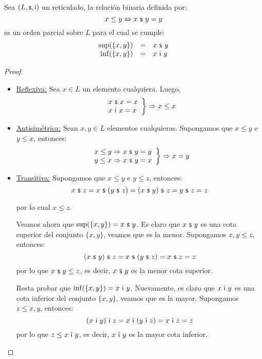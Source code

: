   \begin{theorem} \label{theorem_4}
    \PN Sea $(L, \mathsf{s}, \mathsf{i})$ un reticulado, la relación binaria definida por:
    \[
      x \leq y \Leftrightarrow x \ \SU \ y = y
    \]
    \PN es un orden parcial sobre $L$ para el cual se cumple:
    \[
      \begin{array}{rcl}
        \sup (\{x, y\}) &=& x \ \mathsf{s} \ y \\
        \inf (\{x, y\}) &=& x \ \mathsf{i} \ y
      \end{array}
    \]
  \end{theorem}
  \begin{proof}
    \begin{itemize}
      \item \underline{Reflexiva:} Sea $x \in L$ un elemento cualquiera. Luego,
        \begin{equation*}
          \left.
          \begin{array}{l}
            x \ \mathsf{s} \ x = x \\
            x \ \mathsf{i} \ x = x
          \end{array}
          \right \rbrace \Rightarrow x \leq x
        \end{equation*}

      \item \underline{Antisimétrica:} Sean $x, y \in L$ elementos cualquieras. Supongamos que $x \leq y$ e $y \leq x$,
        entonces:
        \begin{equation*}
          \left.
          \begin{array}{l}
            x \leq y \Rightarrow x \ \mathsf{s} \ y = y \\
            y \leq x \Rightarrow x \ \mathsf{s} \ y = x
          \end{array}
          \right \rbrace \Rightarrow x = y
        \end{equation*}

      \item \underline{Transitiva:} Supongamos que $x \leq y$ e $y \leq z$, entonces:
        \[
          x \ \mathsf{s} \ z = x \ \mathsf{s} \ (y \ \mathsf{s} \ z) = (x \ \mathsf{s} \ y) \ \mathsf{s} \ z = y \ \mathsf{s} \ z = z
        \]

        \PN por lo cual $x \leq z$.

        \PN Veamos ahora que $\sup(\{x, y\}) = x \ \mathsf{s} \ y$. Es claro que $x \ \mathsf{s} \ y$ es una cota superior del
        conjunto $\{x, y\}$, veamos que es la menor. Supongamos $x, y \leq z$, entonces:
        \[
          (x \ \mathsf{s} \ y) \ \mathsf{s} \ z = x \ \mathsf{s} \ (y \ \mathsf{s} \ z) = x \ \mathsf{s} \ z = z
        \]
        \PN por lo que $x\ \mathsf{s} \ y \leq z$, es decir, $x\ \mathsf{s} \ y$ es la menor cota superior.

        \PN Resta probar que $\inf(\{x, y\}) = x \ \mathsf{i} \ y$. Nuevamente, es claro que $x \ \mathsf{i} \ y$ es una cota inferior
        del conjunto $\{x, y\}$, veamos que es la mayor. Supongamos $z \leq x, y$, entonces:
        \[
          (x \ \mathsf{i} \ y) \ \mathsf{i} \ z = x \ \mathsf{i} \ (y \ \mathsf{i} \ z) = x \ \mathsf{i} \ z = z
        \]
        \PN por lo que $z \leq x\ \mathsf{i} \ y$, es decir, $x\ \mathsf{i} \ y$ es la mayor cota inferior.
    \end{itemize}
  \end{proof}

